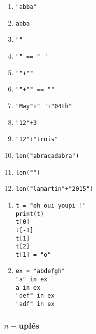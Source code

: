\begin{multicols}{2}
\begin{multicols}{2}
  \begin{enumerate}[label=\emph{\alph*)}]
    \item \texttt{"abba"}
    \item \texttt{abba}
    \item \texttt{""}
    \item \texttt{"" == " "}
    \item \texttt{""+""}
    \item \texttt{""+"" == ""}
    \item \texttt{"May"+" "+"04th"}
    \item \texttt{"12"+3}
    \item \texttt{"12"+"trois"}
    \item \texttt{len("abracadabra")}
    \item \texttt{len("")}
    \item \texttt{len("lamartin"+"2015")}
  \end{enumerate}
\end{multicols}


\begin{enumerate}[label=\emph{\alph*)}]
\item 
\begin{lstlisting}
t = "oh oui youpi !"
print(t)
t[0]
t[-1]
t[1]
t[2]
t[1] = "o" 
\end{lstlisting}
\end{enumerate}

\begin{enumerate}[label=\emph{\alph*)}]
\setcounter{enumi}{1}
\item
\begin{lstlisting}
ex = "abdefgh"
"a" in ex
a in ex
"def" in ex
"adf" in ex
\end{lstlisting}
\end{enumerate}


\subsubsection*{$n-$uplés}


\end{multicols}
